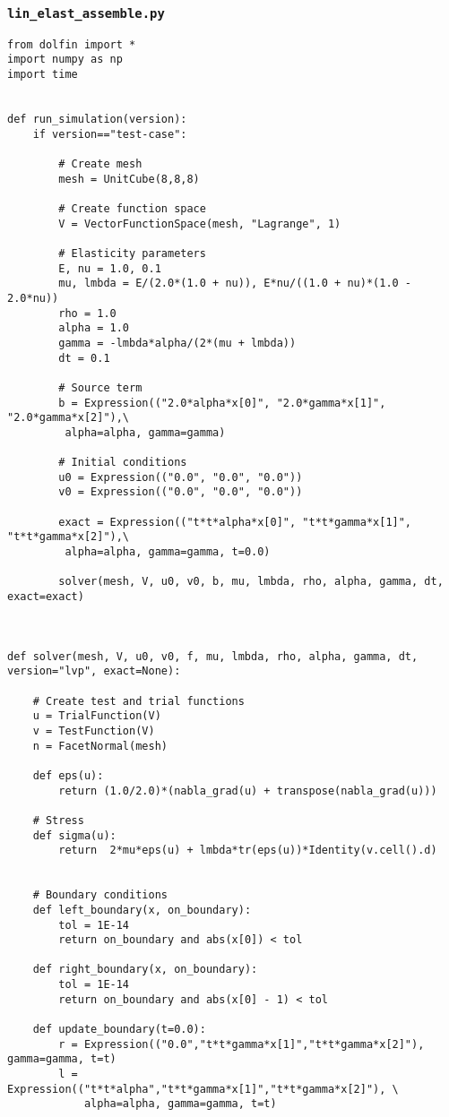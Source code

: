 \documentclass[twoside]{article}
\begin{document}
\subsubsection{\texttt{lin\_elast\_assemble.py}}
\label{time:dependent:assembly:code}
\begin{verbatim}
from dolfin import *
import numpy as np
import time


def run_simulation(version):
	if version=="test-case":

		# Create mesh
		mesh = UnitCube(8,8,8)

		# Create function space
		V = VectorFunctionSpace(mesh, "Lagrange", 1)

		# Elasticity parameters
		E, nu = 1.0, 0.1
		mu, lmbda = E/(2.0*(1.0 + nu)), E*nu/((1.0 + nu)*(1.0 - 2.0*nu))
		rho = 1.0
		alpha = 1.0
		gamma = -lmbda*alpha/(2*(mu + lmbda))
		dt = 0.1

		# Source term
		b = Expression(("2.0*alpha*x[0]", "2.0*gamma*x[1]", "2.0*gamma*x[2]"),\
		 alpha=alpha, gamma=gamma)

		# Initial conditions
		u0 = Expression(("0.0", "0.0", "0.0"))
		v0 = Expression(("0.0", "0.0", "0.0"))

		exact = Expression(("t*t*alpha*x[0]", "t*t*gamma*x[1]", "t*t*gamma*x[2]"),\
		 alpha=alpha, gamma=gamma, t=0.0)

		solver(mesh, V, u0, v0, b, mu, lmbda, rho, alpha, gamma, dt, exact=exact)



def solver(mesh, V, u0, v0, f, mu, lmbda, rho, alpha, gamma, dt, version="lvp", exact=None):
	
	# Create test and trial functions
	u = TrialFunction(V)
	v = TestFunction(V)
	n = FacetNormal(mesh)

	def eps(u):
		return (1.0/2.0)*(nabla_grad(u) + transpose(nabla_grad(u)))

	# Stress
	def sigma(u):
	 	return  2*mu*eps(u) + lmbda*tr(eps(u))*Identity(v.cell().d)


	# Boundary conditions
	def left_boundary(x, on_boundary):
		tol = 1E-14
		return on_boundary and abs(x[0]) < tol

	def right_boundary(x, on_boundary):
		tol = 1E-14
		return on_boundary and abs(x[0] - 1) < tol

	def update_boundary(t=0.0):
		r = Expression(("0.0","t*t*gamma*x[1]","t*t*gamma*x[2]"), gamma=gamma, t=t)
		l = Expression(("t*t*alpha","t*t*gamma*x[1]","t*t*gamma*x[2]"), \
			alpha=alpha, gamma=gamma, t=t)


\end{verbatim}
\end{document}
